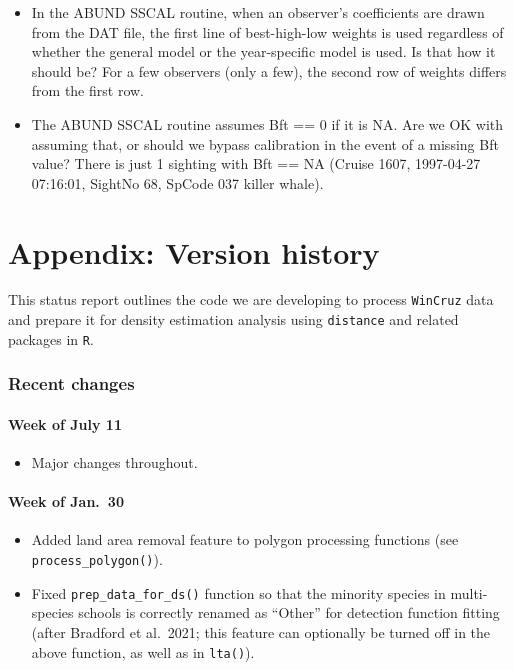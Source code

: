 \documentclass[
]{book}
\providecommand{\tightlist}{%
  \setlength{\itemsep}{0pt}\setlength{\parskip}{0pt}}
\begin{document}
\begin{itemize}
\item
  In the ABUND SSCAL routine, when an observer's coefficients are drawn from the DAT file, the first line of best-high-low weights is used regardless of whether the general model or the year-specific model is used. Is that how it should be? For a few observers (only a few), the second row of weights differs from the first row.
\item
  The ABUND SSCAL routine assumes Bft == 0 if it is NA. Are we OK with assuming that, or should we bypass calibration in the event of a missing Bft value? There is just 1 sighting with Bft == NA (Cruise 1607, 1997-04-27 07:16:01, SightNo 68, SpCode 037 killer whale).
\end{itemize}

\hypertarget{versions}{%
\chapter{Appendix: Version history}\label{versions}}

This status report outlines the code we are developing to process \texttt{WinCruz} data and prepare it for density estimation analysis using \texttt{distance} and related packages in \texttt{R}.

\hypertarget{recent-changes}{%
\subsection*{Recent changes}\label{recent-changes}}

\hypertarget{week-of-july-11}{%
\subsubsection*{Week of July 11}\label{week-of-july-11}}

\begin{itemize}
\tightlist
\item
  Major changes throughout.
\end{itemize}

\hypertarget{week-of-jan.-30}{%
\subsubsection*{Week of Jan.~30}\label{week-of-jan.-30}}

\begin{itemize}
\item
  Added land area removal feature to polygon processing functions (see \texttt{process\_polygon()}).
\item
  Fixed \texttt{prep\_data\_for\_ds()} function so that the minority species in multi-species schools is correctly renamed as ``Other'' for detection function fitting (after Bradford et al.~2021; this feature can optionally be turned off in the above function, as well as in \texttt{lta()}).
\end{itemize}
\end{document}

